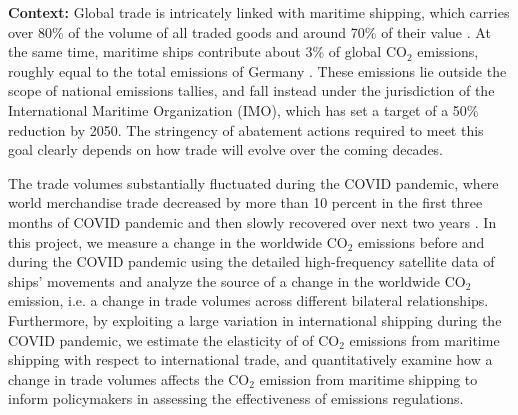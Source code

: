 \documentclass[hidelinks, 12pt,letterpaper]{article}
\begin{document}
\noindent \textbf{Context:} 
Global trade is intricately linked with maritime shipping, which carries over 80\% of the volume of all traded goods and around 70\% of their value \citep{unctad2017review}.
At the same time, maritime ships contribute about 3\% of global CO$_2$ emissions, roughly equal to the total emissions of Germany \citep*{faber2020fourth}. These emissions lie outside the scope of national emissions tallies, and fall instead under the jurisdiction of the International Maritime Organization (IMO), which has set a target of a 50\% reduction by 2050. %
The stringency of abatement actions required to meet this goal clearly depends on how trade will evolve over the coming decades.  %

The trade volumes substantially fluctuated during the COVID pandemic, where  world merchandise trade decreased by more than 10 percent in the first three months of COVID pandemic  and then slowly recovered over next two years \citep{oecd21}. %
In this project, we measure a change in the worldwide CO$_2$ emissions before and during the COVID pandemic using the detailed high-frequency satellite data of ships' movements and analyze the source of a change in the worldwide CO$_2$ emission, i.e. a change in trade volumes across different bilateral relationships. Furthermore, by exploiting a large variation in international shipping during the COVID pandemic, we estimate the elasticity of of CO$_2$ emissions from maritime shipping with respect to international trade, and  quantitatively examine how a change in trade volumes affects the CO$_2$ emission from maritime shipping to inform policymakers  in assessing the effectiveness of emissions regulations.  %
\end{document}
